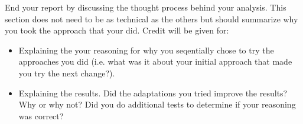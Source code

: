 \documentclass[11pt]{article}
\begin{document}
End your report by discussing the thought process behind your
analysis. This section does not need to be as technical as the others 
but should summarize why you took the approach that your did. Credit will be given for:

  \begin{itemize}
  \item Explaining the your reasoning for why you seqentially chose to
    try the approaches you did (i.e. what was it about your initial
    approach that made you try the next change?).  
  \item Explaining the results.  Did the adaptations you tried improve
    the results?  Why or why not?  Did you do additional tests to
    determine if your reasoning was correct?  
  \end{itemize}
 
\end{document}
